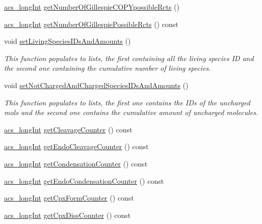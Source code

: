 \begin{DoxyCompactItemize}
\item 
\hyperlink{a00016_a19319d75f02db4308bc5c0026d98cd85}{acs\-\_\-long\-Int} \hyperlink{a00003_a61d3f0644f40fb68be59bff6fad5176e}{get\-Number\-Of\-Gillespie\-C\-O\-P\-Ypossible\-Rcts} ()
\item 
\hyperlink{a00016_a19319d75f02db4308bc5c0026d98cd85}{acs\-\_\-long\-Int} \hyperlink{a00003_a3140242018e8232dfa89a127ac1bb282}{get\-Number\-Of\-Gillespie\-Possible\-Rcts} () const 
\item 
void \hyperlink{a00003_a4fb98d7cad06ef479e2643785231feb9}{set\-Living\-Species\-I\-Ds\-And\-Amounts} ()
\begin{DoxyCompactList}\small\item\em This function populates to lists, the first containing all the living species I\-D and the second one containing the cumulative number of living species. \end{DoxyCompactList}\item 
void \hyperlink{a00003_ac5528a39937cdc76f0dd23c27542110c}{set\-Not\-Charged\-And\-Charged\-Species\-I\-Ds\-And\-Amounts} ()
\begin{DoxyCompactList}\small\item\em This function populates to lists, the first one contains the I\-Ds of the uncharged mols and the second one contains the cumulative amount of uncharged molecules. \end{DoxyCompactList}\item 
\hyperlink{a00016_a19319d75f02db4308bc5c0026d98cd85}{acs\-\_\-long\-Int} \hyperlink{a00003_a8b9a3b5c5a2f86206c5fb124352e366e}{get\-Cleavage\-Counter} () const 
\item 
\hyperlink{a00016_a19319d75f02db4308bc5c0026d98cd85}{acs\-\_\-long\-Int} \hyperlink{a00003_aa2ded3c5ba8c4ce41ee86399dc616d4a}{get\-Endo\-Cleavage\-Counter} () const 
\item 
\hyperlink{a00016_a19319d75f02db4308bc5c0026d98cd85}{acs\-\_\-long\-Int} \hyperlink{a00003_a0fc62131bf552c2a995c7ddc461828cd}{get\-Condensation\-Counter} () const 
\item 
\hyperlink{a00016_a19319d75f02db4308bc5c0026d98cd85}{acs\-\_\-long\-Int} \hyperlink{a00003_aaa23d550cfa37344dd3bb4d5767e6ea0}{get\-Endo\-Condensation\-Counter} () const 
\item 
\hyperlink{a00016_a19319d75f02db4308bc5c0026d98cd85}{acs\-\_\-long\-Int} \hyperlink{a00003_a5d72675f37c3936c58d27480613a9ab6}{get\-Cpx\-Form\-Counter} () const 
\item 
\hyperlink{a00016_a19319d75f02db4308bc5c0026d98cd85}{acs\-\_\-long\-Int} \hyperlink{a00003_abf2f63b22c52e17f6089f098651584b8}{get\-Cpx\-Diss\-Counter} () const 

\end{DoxyCompactItemize}
